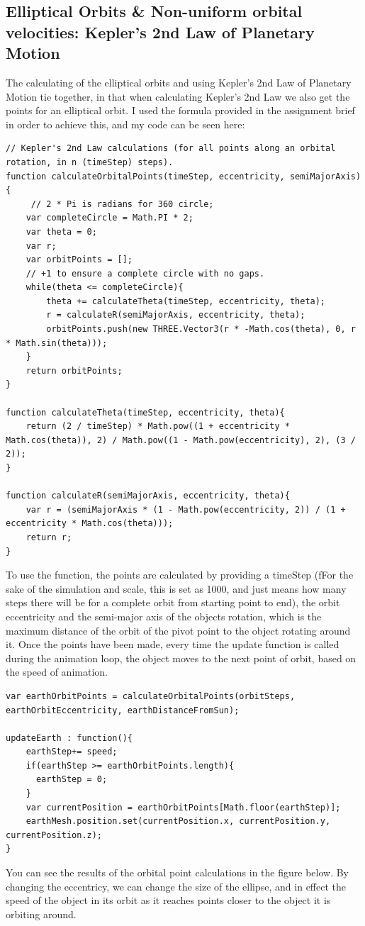 \documentclass[12pt]{article}
\begin{document}
\subsection{Elliptical Orbits \& Non-uniform orbital velocities: Kepler's 2nd Law of Planetary Motion}
The calculating of the elliptical orbits and using Kepler's 2nd Law of Planetary Motion tie together, in that when calculating Kepler's 2nd Law we also get the points for an elliptical orbit. I used the formula provided in the assignment brief \cite{assignment} in order to achieve this, and my code can be seen here:
\begin{lstlisting}
// Kepler's 2nd Law calculations (for all points along an orbital rotation, in n (timeStep) steps).
function calculateOrbitalPoints(timeStep, eccentricity, semiMajorAxis){
	 // 2 * Pi is radians for 360 circle;
	var completeCircle = Math.PI * 2;
	var theta = 0;
	var r;
	var orbitPoints = [];
	// +1 to ensure a complete circle with no gaps.
	while(theta <= completeCircle){
		theta += calculateTheta(timeStep, eccentricity, theta);
		r = calculateR(semiMajorAxis, eccentricity, theta);
		orbitPoints.push(new THREE.Vector3(r * -Math.cos(theta), 0, r * Math.sin(theta)));
	}
	return orbitPoints;
}

function calculateTheta(timeStep, eccentricity, theta){
	return (2 / timeStep) * Math.pow((1 + eccentricity * Math.cos(theta)), 2) / Math.pow((1 - Math.pow(eccentricity), 2), (3 / 2));
}

function calculateR(semiMajorAxis, eccentricity, theta){
	var r = (semiMajorAxis * (1 - Math.pow(eccentricity, 2)) / (1 + eccentricity * Math.cos(theta)));
	return r;
}
\end{lstlisting}

To use the function, the points are calculated by providing a timeStep (fFor the sake of the simulation and scale, this is set as 1000, and just means how many steps there will be for a complete orbit from starting point to end), the orbit eccentricity and the semi-major axis of the objects rotation, which is the maximum distance of the orbit of the pivot point to the object rotating around it. Once the points have been made, every time the update function is called during the animation loop, the object moves to the next point of orbit, based on the speed of animation.

\begin{lstlisting}
var earthOrbitPoints = calculateOrbitalPoints(orbitSteps, earthOrbitEccentricity, earthDistanceFromSun);

updateEarth : function(){
    earthStep+= speed;
    if(earthStep >= earthOrbitPoints.length){
      earthStep = 0;
    }
    var currentPosition = earthOrbitPoints[Math.floor(earthStep)];
    earthMesh.position.set(currentPosition.x, currentPosition.y, currentPosition.z);
}
\end{lstlisting}
You can see the results of the orbital point calculations in the figure below. By changing the eccentricy, we can change the size of the ellipse, and in effect the speed of the object in its orbit as it reaches points closer to the object it is orbiting around.
\end{document}
